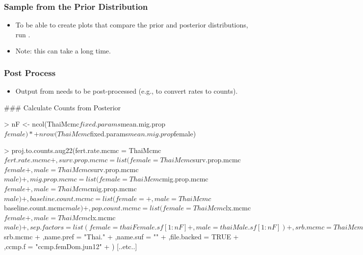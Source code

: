 \documentclass[smaller,compress,table]{beamer}
\begin{document}
\begin{frame}
  \frametitle{Sample from the Prior Distribution }
  \begin{itemize}
  \item To be able to create plots that compare the prior and posterior distributions, run .
  \item Note: this can take a long time.
  \end{itemize}
\end{frame}


\begin{frame}[fragile]
  \frametitle{Post Process }
  \begin{itemize}
  \item Output from  needs to be post-processed (e.g., to convert rates to counts).
  \end{itemize}
\begin{Schunk}
\begin{Sinput}

### Calculate Counts from Posterior

> nF <- ncol(ThaiMcmc$fixed.params$mean.mig.prop$female) *
+    nrow(ThaiMcmc$fixed.params$mean.mig.prop$female)

> proj.to.counts.aug22(fert.rate.mcmc = ThaiMcmc$fert.rate.mcmc
+                     ,surv.prop.mcmc = list(female = ThaiMcmc$surv.prop.mcmc$female
+                      ,male = ThaiMcmc$surv.prop.mcmc$male)
+                     ,mig.prop.mcmc = list(female = ThaiMcmc$mig.prop.mcmc$female
+                      ,male = ThaiMcmc$mig.prop.mcmc$male)
+                     ,baseline.count.mcmc = list(female =
+                      ,male = ThaiMcmc$baseline.count.mcmc$male)
+                     ,pop.count.mcmc = list(female = ThaiMcmc$lx.mcmc$female
+                      ,male = ThaiMcmc$lx.mcmc$male)
+                     ,sep.factors = list(female = thaiFemale.sf[1:nF]
+                      ,male = thaiMale.sf[1:nF])
+                     ,srb.mcmc = ThaiMcmc$srb.mcmc
+                     ,name.pref = "Thai."
+                     ,name.suf = ""
+                     ,file.backed = TRUE
+                     ,ccmp.f = "ccmp.femDom.jun12"
+                     )
[..etc..]
\end{Sinput}
\end{Schunk}
\end{frame}
\end{document}
